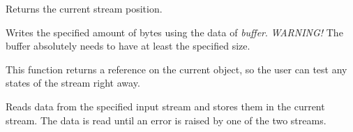 

Returns the current stream position.



Writes the specified amount of bytes using the data of {\it buffer}. 
{\it WARNING!} The buffer absolutely needs to have at least the specified size.

This function returns a reference on the current object, so the user can test
any states of the stream right away.


Reads data from the specified input stream and stores them 
in the current stream. The data is read until an error is raised
by one of the two streams.

